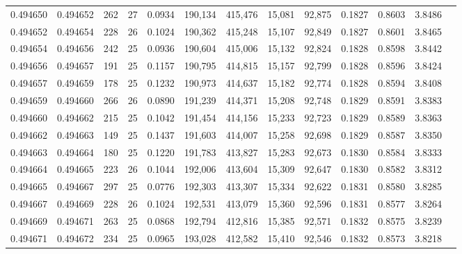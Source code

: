 \begin{tabular}{rrrrrrrrrrrrr}
0.494650 & 0.494652 & 262 &  27 &                                     0.0934 & 190,134 & 415,476 &  15,081 &  92,875 & 0.1827 & 0.8603 & 3.8486 \\
0.494652 & 0.494654 & 228 &  26 &                                     0.1024 & 190,362 & 415,248 &  15,107 &  92,849 & 0.1827 & 0.8601 & 3.8465 \\
0.494654 & 0.494656 & 242 &  25 &                                     0.0936 & 190,604 & 415,006 &  15,132 &  92,824 & 0.1828 & 0.8598 & 3.8442 \\
0.494656 & 0.494657 & 191 &  25 &                                     0.1157 & 190,795 & 414,815 &  15,157 &  92,799 & 0.1828 & 0.8596 & 3.8424 \\
0.494657 & 0.494659 & 178 &  25 &                                     0.1232 & 190,973 & 414,637 &  15,182 &  92,774 & 0.1828 & 0.8594 & 3.8408 \\
0.494659 & 0.494660 & 266 &  26 &                                     0.0890 & 191,239 & 414,371 &  15,208 &  92,748 & 0.1829 & 0.8591 & 3.8383 \\
0.494660 & 0.494662 & 215 &  25 &                                     0.1042 & 191,454 & 414,156 &  15,233 &  92,723 & 0.1829 & 0.8589 & 3.8363 \\
0.494662 & 0.494663 & 149 &  25 &                                     0.1437 & 191,603 & 414,007 &  15,258 &  92,698 & 0.1829 & 0.8587 & 3.8350 \\
0.494663 & 0.494664 & 180 &  25 &                                     0.1220 & 191,783 & 413,827 &  15,283 &  92,673 & 0.1830 & 0.8584 & 3.8333 \\
0.494664 & 0.494665 & 223 &  26 &                                     0.1044 & 192,006 & 413,604 &  15,309 &  92,647 & 0.1830 & 0.8582 & 3.8312 \\
0.494665 & 0.494667 & 297 &  25 &                                     0.0776 & 192,303 & 413,307 &  15,334 &  92,622 & 0.1831 & 0.8580 & 3.8285 \\
0.494667 & 0.494669 & 228 &  26 &                                     0.1024 & 192,531 & 413,079 &  15,360 &  92,596 & 0.1831 & 0.8577 & 3.8264 \\
0.494669 & 0.494671 & 263 &  25 &                                     0.0868 & 192,794 & 412,816 &  15,385 &  92,571 & 0.1832 & 0.8575 & 3.8239 \\
0.494671 & 0.494672 & 234 &  25 &                                     0.0965 & 193,028 & 412,582 &  15,410 &  92,546 & 0.1832 & 0.8573 & 3.8218 \\

\end{tabular}
